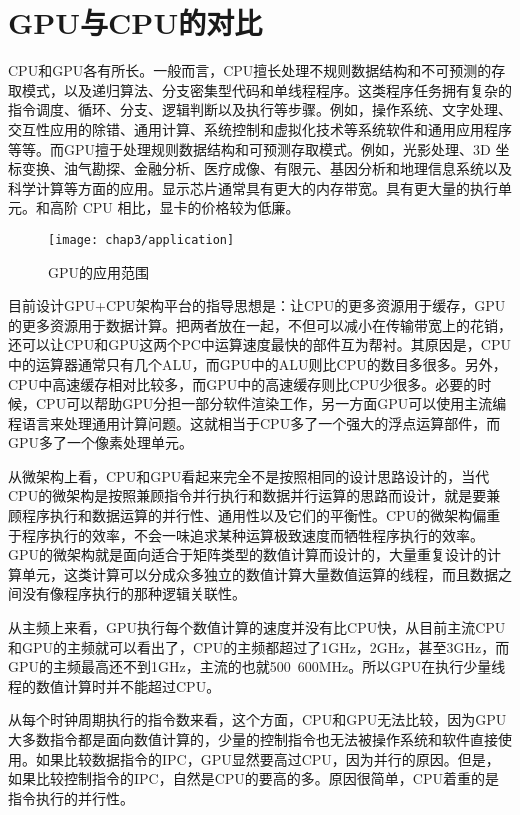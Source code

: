   \section{GPU与CPU的对比}
    CPU和GPU各有所长。一般而言，CPU擅长处理不规则数据结构和不可预测的存取模式，以及递归算法、分支密集型代码和单线程程序。这类程序任务拥有复杂的指令调度、循环、分支、逻辑判断以及执行等步骤。例如，操作系统、文字处理、交互性应用的除错、通用计算、系统控制和虚拟化技术等系统软件和通用应用程序等等。而GPU擅于处理规则数据结构和可预测存取模式。例如，光影处理、3D 坐标变换、油气勘探、金融分析、医疗成像、有限元、基因分析和地理信息系统以及科学计算等方面的应用。显示芯片通常具有更大的内存带宽。具有更大量的执行单元。和高阶 CPU 相比，显卡的价格较为低廉。
    \begin{figure}[htp]
      \centering
      \texttt{[image: chap3/application]}
      \caption{GPU的应用范围}
    \end{figure}
    \par
    目前设计GPU+CPU架构平台的指导思想是：让CPU的更多资源用于缓存，GPU的更多资源用于数据计算。把两者放在一起，不但可以减小在传输带宽上的花销，还可以让CPU和GPU这两个PC中运算速度最快的部件互为帮衬。其原因是，CPU中的运算器通常只有几个ALU，而GPU中的ALU则比CPU的数目多很多。另外，CPU中高速缓存相对比较多，而GPU中的高速缓存则比CPU少很多。必要的时候，CPU可以帮助GPU分担一部分软件渲染工作，另一方面GPU可以使用主流编程语言来处理通用计算问题。这就相当于CPU多了一个强大的浮点运算部件，而GPU多了一个像素处理单元。
    \par
    从微架构上看，CPU和GPU看起来完全不是按照相同的设计思路设计的，当代CPU的微架构是按照兼顾指令并行执行和数据并行运算的思路而设计，就是要兼顾程序执行和数据运算的并行性、通用性以及它们的平衡性。CPU的微架构偏重于程序执行的效率，不会一味追求某种运算极致速度而牺牲程序执行的效率。GPU的微架构就是面向适合于矩阵类型的数值计算而设计的，大量重复设计的计算单元，这类计算可以分成众多独立的数值计算大量数值运算的线程，而且数据之间没有像程序执行的那种逻辑关联性。
    \par
    从主频上来看，GPU执行每个数值计算的速度并没有比CPU快，从目前主流CPU和GPU的主频就可以看出了，CPU的主频都超过了1GHz，2GHz，甚至3GHz，而GPU的主频最高还不到1GHz，主流的也就500~600MHz。所以GPU在执行少量线程的数值计算时并不能超过CPU。
    \par
    从每个时钟周期执行的指令数来看，这个方面，CPU和GPU无法比较，因为GPU大多数指令都是面向数值计算的，少量的控制指令也无法被操作系统和软件直接使用。如果比较数据指令的IPC，GPU显然要高过CPU，因为并行的原因。但是，如果比较控制指令的IPC，自然是CPU的要高的多。原因很简单，CPU着重的是指令执行的并行性。
